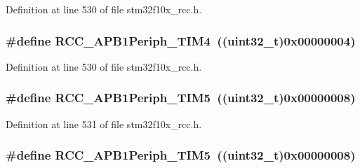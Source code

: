 Definition at line 530 of file stm32f10x\+\_\+rcc.\+h.

\subsubsection[{\texorpdfstring{R\+C\+C\+\_\+\+A\+P\+B1\+Periph\+\_\+\+T\+I\+M4}{RCC_APB1Periph_TIM4}}]{\setlength{\rightskip}{0pt plus 5cm}\#define R\+C\+C\+\_\+\+A\+P\+B1\+Periph\+\_\+\+T\+I\+M4~(({\bf uint32\+\_\+t})0x00000004)}\hypertarget{group___a_p_b1__peripheral_ga80f9f3720804a97210b723696bd94d83}{}\label{group___a_p_b1__peripheral_ga80f9f3720804a97210b723696bd94d83}


Definition at line 530 of file stm32f10x\+\_\+rcc.\+h.

\subsubsection[{\texorpdfstring{R\+C\+C\+\_\+\+A\+P\+B1\+Periph\+\_\+\+T\+I\+M5}{RCC_APB1Periph_TIM5}}]{\setlength{\rightskip}{0pt plus 5cm}\#define R\+C\+C\+\_\+\+A\+P\+B1\+Periph\+\_\+\+T\+I\+M5~(({\bf uint32\+\_\+t})0x00000008)}\hypertarget{group___a_p_b1__peripheral_ga4905c26000a571fa01fc057fe31d254a}{}\label{group___a_p_b1__peripheral_ga4905c26000a571fa01fc057fe31d254a}


Definition at line 531 of file stm32f10x\+\_\+rcc.\+h.

\subsubsection[{\texorpdfstring{R\+C\+C\+\_\+\+A\+P\+B1\+Periph\+\_\+\+T\+I\+M5}{RCC_APB1Periph_TIM5}}]{\setlength{\rightskip}{0pt plus 5cm}\#define R\+C\+C\+\_\+\+A\+P\+B1\+Periph\+\_\+\+T\+I\+M5~(({\bf uint32\+\_\+t})0x00000008)}\hypertarget{group___a_p_b1__peripheral_ga4905c26000a571fa01fc057fe31d254a}{}\label{group___a_p_b1__peripheral_ga4905c26000a571fa01fc057fe31d254a}


